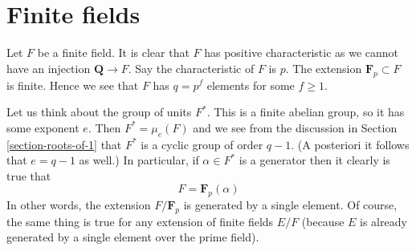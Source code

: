 \section{Finite fields}
\label{section-finite}

\noindent
Let $F$ be a finite field. It is clear that $F$ has positive characteristic
as we cannot have an injection $\mathbf{Q} \to F$. Say the characteristic
of $F$ is $p$. The extension $\mathbf{F}_p \subset F$ is finite.
Hence we see that $F$ has $q = p^f$ elements for some $f \geq 1$.

\medskip\noindent
Let us think about the group of units $F^*$. This is a finite abelian
group, so it has some exponent $e$. Then $F^* = \mu_e(F)$ and we see
from the discussion in Section \ref{section-roots-of-1} that $F^*$
is a cyclic group of order $q - 1$. (A posteriori it follows that
$e = q - 1$ as well.) In particular, if $\alpha \in F^*$ is a generator
then it clearly is true that
$$
F = \mathbf{F}_p(\alpha)
$$
In other words, the extension $F/\mathbf{F}_p$ is generated by a single
element. Of course, the same thing is true for any extension of finite
fields $E/F$ (because $E$ is already generated by a single element over
the prime field).





